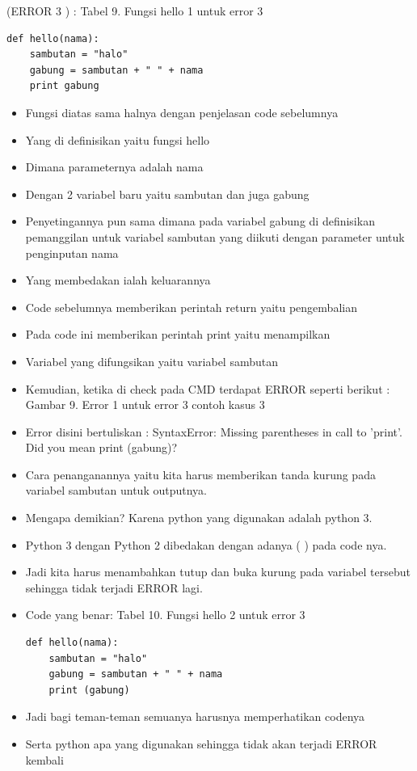 (ERROR 3 ) :
Tabel 9. Fungsi hello 1 untuk error 3
\begin{verbatim}
def hello(nama):
	sambutan = "halo"
	gabung = sambutan + " " + nama
	print gabung
\end{verbatim}
\begin{itemize}
\item Fungsi diatas sama halnya dengan penjelasan code sebelumnya
\item Yang di definisikan yaitu fungsi hello
\item Dimana parameternya adalah nama
\item Dengan 2 variabel baru yaitu sambutan dan juga gabung
\item Penyetingannya pun sama dimana pada variabel gabung di definisikan pemanggilan  untuk  variabel  sambutan  yang  diikuti  dengan  parameter untuk penginputan nama
\item Yang membedakan ialah keluarannya
\item Code sebelumnya memberikan perintah return yaitu pengembalian
\item Pada code ini memberikan perintah print yaitu menampilkan
\item Variabel yang difungsikan yaitu variabel sambutan
\item Kemudian, ketika di check pada CMD terdapat ERROR seperti berikut :
Gambar 9. Error 1 untuk error 3 contoh kasus 3
\item Error disini bertuliskan :
SyntaxError:  Missing  parentheses  in  call  to  'print'.  Did  you  mean print (gabung)?
\item Cara  penanganannya  yaitu  kita  harus  memberikan tanda  kurung  pada variabel sambutan untuk outputnya.
\item Mengapa demikian? Karena python yang digunakan adalah python 3. 
\item Python 3 dengan Python 2 dibedakan dengan adanya ( ) pada code nya. 
\item Jadi kita harus menambahkan tutup dan buka kurung pada variabel tersebut sehingga tidak terjadi ERROR lagi.
\item Code yang benar:
Tabel 10. Fungsi hello 2 untuk error 3
\begin{verbatim}
def hello(nama):
	sambutan = "halo"
	gabung = sambutan + " " + nama
	print (gabung)
\end{verbatim}
\item Jadi bagi teman-teman semuanya harusnya memperhatikan codenya
\item Serta python apa yang digunakan sehingga tidak akan terjadi ERROR kembali
\end{itemize}

